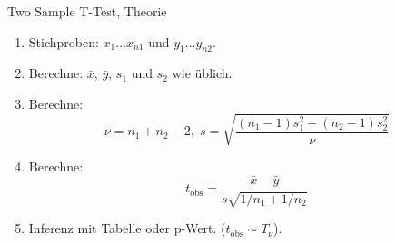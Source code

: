 \documentclass{beamer}
\begin{document}
%
%
%
%

\begin{frame}{Two Sample T-Test, Theorie}
\begin{enumerate}
\item Stichproben: $x_1\ldots x_{n1}$ und $y_1\ldots y_{n2}$.
\item Berechne: $\bar{x}$, $\bar{y}$, $s_1$ und $s_2$ wie üblich.
\item Berechne: 
$$
\nu=n_1+n_2-2,\;
s=\sqrt{\frac{(n_1-1)s_1^2+(n_2-1)s_2^2}{\nu}}
$$

\item Berechne:
$$
t_\text{obs}=\frac{\bar{x}-\bar{y}}{s\sqrt{1/n_1+1/n_2}}
$$
\item Inferenz mit Tabelle oder p-Wert. ($t_\text{obs}\sim T_\nu$).
\end{enumerate}
\end{frame}
\end{document}
